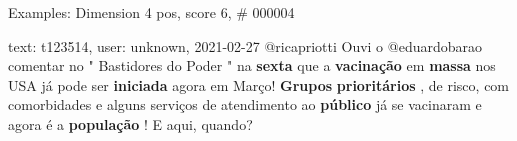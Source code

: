 \begin{frame}{Examples: Dimension 4 pos, score 6, \# 000004}
\footnotesize
\begin{exampleblock}{text: t123514, user: unknown, 2021-02-27}
@ricapriotti Ouvi o @eduardobarao comentar no " Bastidores do Poder " na 
\textbf{sexta} que a \textbf{vacinação} em \textbf{massa} nos USA já pode ser 
\textbf{iniciada} agora em Março! \textbf{Grupos} \textbf{prioritários} , de 
risco, com comorbidades e alguns serviços de atendimento ao \textbf{público} já 
se vacinaram e agora é a \textbf{população} ! E aqui, quando? 
\end{exampleblock}
\end{frame}
